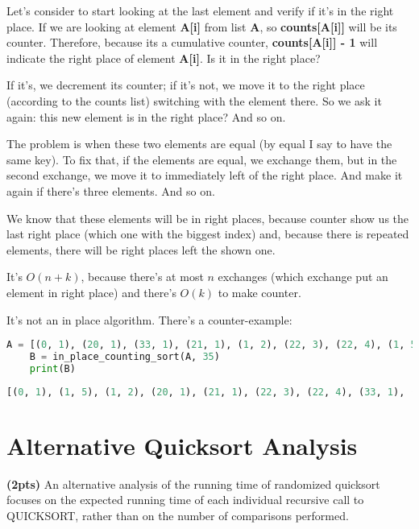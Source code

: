 \documentclass{article}
\begin{document}
\begin{enumerate}[label=(\alph*)]
  Let's consider to start looking at the last element and verify if it's in the right place. If we are looking at element \textbf{A[i]} from list \textbf{A}, so \textbf{counts[A[i]]} will be its counter. Therefore, because its a cumulative counter, \textbf{counts[A[i]] - 1} will indicate the right place of element \textbf{A[i]}. Is it in the right place?
  
  If it's, we decrement its counter; if it's not, we move it to the right place (according to the counts list) switching with the element there. So we ask it again: this new element is in the right place? And so on.
  
  The problem is when these two elements are equal (by equal I say to have the same key). To fix that, if the elements are equal, we exchange them, but in the second exchange, we move it to immediately left of the right place. And make it again if there's three elements. And so on.
  
  We know that these elements will be in right places, because counter show us the last right place (which one with the biggest index) and, because there is repeated elements, there will be right places left the shown one.
  
  It's $O(n+k)$, because there's at most $n$ exchanges (which exchange put an element in right place) and there's $O(k)$ to make counter.
  
  It's not an in place algorithm. There's a counter-example:
 
  \begin{lstlisting}[language=Python] 
    A = [(0, 1), (20, 1), (33, 1), (21, 1), (1, 2), (22, 3), (22, 4), (1, 5), (34, 1)]
    B = in_place_counting_sort(A, 35)
    print(B)
  \end{lstlisting} 
  \begin{lstlisting}[language=Python]
    [(0, 1), (1, 5), (1, 2), (20, 1), (21, 1), (22, 3), (22, 4), (33, 1), (34, 1)]
  \end{lstlisting}

\end{enumerate}

\section{Alternative Quicksort Analysis} 
\textbf{(2pts)} An alternative analysis of the running time of randomized quicksort focuses on the expected running time of each individual recursive call to QUICKSORT, rather than on the number of comparisons performed.
\end{document}
